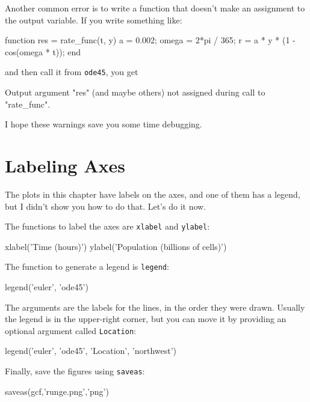 \documentclass[../../book.tex]{subfiles}
\begin{document}
Another common error is to write a function that doesn't make
an assignment to the output variable.  If you write something
like:

\begin{code}
function res = rate_func(t, y)
    a = 0.002;
    omega = 2*pi / 365;
    r = a * y * (1 - cos(omega * t));    %
end
\end{code}
 and then call it from \lstinline{ode45}, you get

\begin{code}
Output argument "res" (and maybe others) not assigned during call
to "rate_func".
\end{code}

I hope these warnings save you some time debugging.

\section{Labeling Axes}

The plots in this chapter have labels on the axes, and one of them has a legend, but I didn't show you how to do that.  Let's do it now.


The functions to label the axes are \lstinline{xlabel} and \lstinline{ylabel}:

\begin{code}
xlabel('Time (hours)')
ylabel('Population (billions of cells)')
\end{code}

The function to generate a legend is \lstinline{legend}:

\begin{code}
legend('euler', 'ode45')
\end{code}


The arguments are the labels for the lines, in the order they were drawn.  Usually the legend is in the upper-right corner, but you can move it by providing an optional argument called \lstinline{Location}:

\begin{code}
legend('euler', 'ode45', 'Location', 'northwest')
\end{code}

Finally,  save the figures using \lstinline{saveas}:

\begin{code}
saveas(gcf,'runge.png','png')
\end{code}
\end{document}

